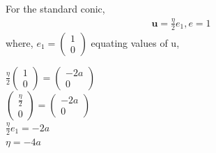 \documentclass[journal,12pt,twocolumn]{IEEEtran}
\newcommand{\myvec}[1]{\ensuremath{\begin{pmatrix}#1\end{pmatrix}}}
\let\vec\mathbf
\begin{document}
For the standard conic,\\
\begin{align}
\label{eq:two}
\vec{u}=\frac{\eta}{2}e_1 , e=1
\end{align}
where, $e_1=\myvec{1\\0}$
equating values of u,\\
\begin{center}
$\frac{\eta}{2}\myvec{1\\0}=\myvec{-2a\\0}$\\
$\myvec{\frac{\eta}{2} \\ 0}=\myvec{-2a\\0}$\\
$\frac{\eta}{2}e_1=-2a$\\
$\eta=-4a$
\end{center}
\end{document}
